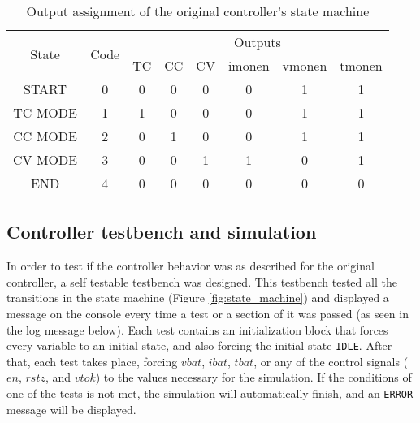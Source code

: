 \documentclass[12pt]{article}
\begin{document}
\begin{table}[H]
\centering
\begin{tabular}{|c|c|cccccc|}
\hline
\multirow{2}{*}{State} &
  \multirow{2}{*}{Code} &
  \multicolumn{6}{c|}{Outputs} \\ \cline{3-8} 
 &  & \multicolumn{1}{c|}{TC} & \multicolumn{1}{c|}{CC} & \multicolumn{1}{c|}{CV} & \multicolumn{1}{c|}{imonen} & \multicolumn{1}{c|}{vmonen} & tmonen \\ \hline
START &
  0 &
  \multicolumn{1}{c|}{0} &
  \multicolumn{1}{c|}{0} &
  \multicolumn{1}{c|}{0} &
  \multicolumn{1}{c|}{0} &
  \multicolumn{1}{c|}{1} &
  1 \\ \hline
TC MODE &
  1 &
  \multicolumn{1}{c|}{1} &
  \multicolumn{1}{c|}{0} &
  \multicolumn{1}{c|}{0} &
  \multicolumn{1}{c|}{0} &
  \multicolumn{1}{c|}{1} &
  1 \\ \hline
CC MODE &
  2 &
  \multicolumn{1}{c|}{0} &
  \multicolumn{1}{c|}{1} &
  \multicolumn{1}{c|}{0} &
  \multicolumn{1}{c|}{0} &
  \multicolumn{1}{c|}{1} &
  1 \\ \hline
CV MODE &
  3 &
  \multicolumn{1}{c|}{0} &
  \multicolumn{1}{c|}{0} &
  \multicolumn{1}{c|}{1} &
  \multicolumn{1}{c|}{1} &
  \multicolumn{1}{c|}{0} &
  1 \\ \hline
END &
  4 &
  \multicolumn{1}{c|}{0} &
  \multicolumn{1}{c|}{0} &
  \multicolumn{1}{c|}{0} &
  \multicolumn{1}{c|}{0} &
  \multicolumn{1}{c|}{0} &
  0 \\ \hline
\end{tabular}
\caption{Output assignment of the original controller's state machine}
\label{tab:newCont_outputs}
\end{table}


\subsection{Controller testbench and simulation}
\label{part:controller_test_part}

In order to test if the controller behavior was as described for the original controller, a self testable testbench was designed. This testbench tested all the transitions in the state machine (Figure \ref{fig:state_machine}) and displayed a message on the console every time a test or a section of it was passed (as seen in the log message below). Each test contains an initialization block that forces every variable to an initial state, and also forcing the initial state \texttt{IDLE}. After that, each test takes place, forcing $vbat$, $ibat$, $tbat$, or any of the control signals ($en$, $rstz$, and $vtok$) to the values necessary for the simulation. If the conditions of one of the tests is not met, the simulation will automatically finish, and an \texttt{ERROR} message will be displayed.
\end{document}
